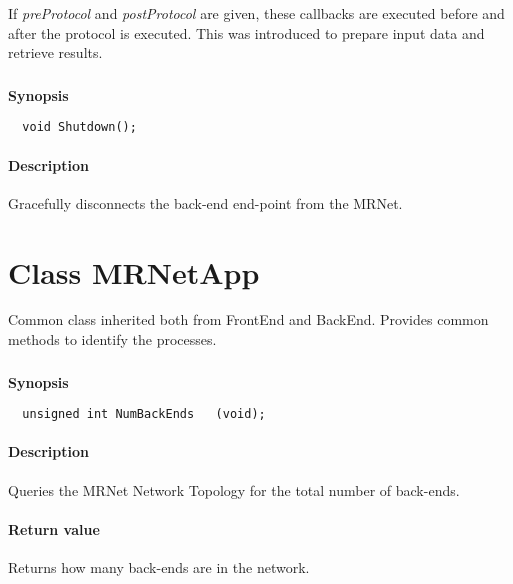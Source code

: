 \documentclass[twoside,a4,english,11pt]{book}
\begin{document}
  If \emph{preProtocol} and \emph{postProtocol} are given, these callbacks 
  are executed before and after the protocol is executed. This was introduced
  to prepare input data and retrieve results. 

\subsubsection{}

\textbf{Synopsis}
\begin{lstlisting}
  void Shutdown();
\end{lstlisting}

\paragraph{Description}
  Gracefully disconnects the back-end end-point from the MRNet.

\section{Class MRNetApp}

Common class inherited both from FrontEnd and BackEnd. Provides common methods to identify the processes.

\subsubsection{}

\textbf{Synopsis}
\begin{lstlisting}
  unsigned int NumBackEnds   (void);
\end{lstlisting}

\paragraph{Description}
  Queries the MRNet Network Topology for the total number of back-ends.

\paragraph{Return value}
  Returns how many back-ends are in the network.

\subsubsection{}
\end{document}
